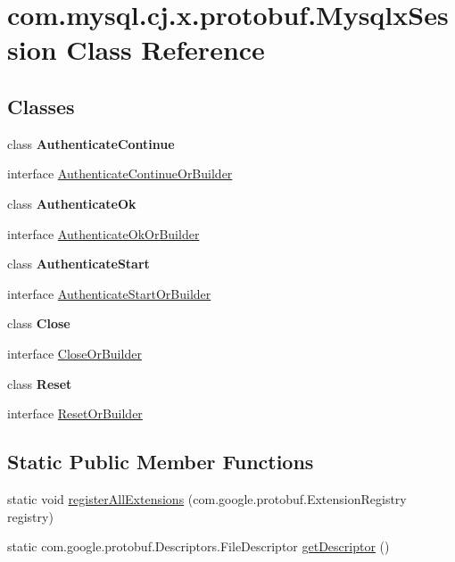\hypertarget{classcom_1_1mysql_1_1cj_1_1x_1_1protobuf_1_1_mysqlx_session}{}\section{com.\+mysql.\+cj.\+x.\+protobuf.\+Mysqlx\+Session Class Reference}
\label{classcom_1_1mysql_1_1cj_1_1x_1_1protobuf_1_1_mysqlx_session}
\subsection*{Classes}
\begin{DoxyCompactItemize}
\item 
class {\bfseries Authenticate\+Continue}
\item 
interface \mbox{\hyperlink{interfacecom_1_1mysql_1_1cj_1_1x_1_1protobuf_1_1_mysqlx_session_1_1_authenticate_continue_or_builder}{Authenticate\+Continue\+Or\+Builder}}
\item 
class {\bfseries Authenticate\+Ok}
\item 
interface \mbox{\hyperlink{interfacecom_1_1mysql_1_1cj_1_1x_1_1protobuf_1_1_mysqlx_session_1_1_authenticate_ok_or_builder}{Authenticate\+Ok\+Or\+Builder}}
\item 
class {\bfseries Authenticate\+Start}
\item 
interface \mbox{\hyperlink{interfacecom_1_1mysql_1_1cj_1_1x_1_1protobuf_1_1_mysqlx_session_1_1_authenticate_start_or_builder}{Authenticate\+Start\+Or\+Builder}}
\item 
class {\bfseries Close}
\item 
interface \mbox{\hyperlink{interfacecom_1_1mysql_1_1cj_1_1x_1_1protobuf_1_1_mysqlx_session_1_1_close_or_builder}{Close\+Or\+Builder}}
\item 
class {\bfseries Reset}
\item 
interface \mbox{\hyperlink{interfacecom_1_1mysql_1_1cj_1_1x_1_1protobuf_1_1_mysqlx_session_1_1_reset_or_builder}{Reset\+Or\+Builder}}
\end{DoxyCompactItemize}
\subsection*{Static Public Member Functions}
\begin{DoxyCompactItemize}
\item 
static void \mbox{\hyperlink{classcom_1_1mysql_1_1cj_1_1x_1_1protobuf_1_1_mysqlx_session_af02253cfc5f4eb6de69b962eec9818a1}{register\+All\+Extensions}} (com.\+google.\+protobuf.\+Extension\+Registry registry)
\item 
static com.\+google.\+protobuf.\+Descriptors.\+File\+Descriptor \mbox{\hyperlink{classcom_1_1mysql_1_1cj_1_1x_1_1protobuf_1_1_mysqlx_session_a96b1ed99c26853eaa3f4cf7fab4a9809}{get\+Descriptor}} ()
\end{DoxyCompactItemize}


